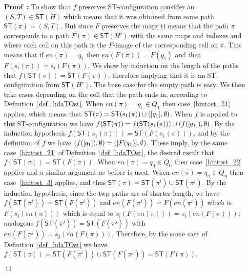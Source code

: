 \documentclass[submission,copyright,creativecommons]{eptcs}
\newenvironment{proof}[1][\!\!\,]{\vspace{1ex}\noindent\textbf{Proof #1: }}{\hfill$\Box$\vspace{2ex}}
\newcounter{case}
\newcommand\hintost{\ensuremath{\mathsf{ST}}}
\newcommand\finishPath[1]{\ensuremath{\mathit{en}(#1)}}
\newcommand{\equivClass}[2][]{\ensuremath{[#2]\ifthenelse{\equal{#1}{}}{}{_{#1}}}}
\begin{document}
\begin{proof}
To show that $f$ preserves ST-configuration consider an $(S,T)\in\hintost(H)$ which means that it was obtained from some path $\hintost(\pi)=(S,T)$. But since $F$ preserves the maps ti means that the path $\pi$ corresponds to a path $F(\pi)\in\hintost(H')$ with the same maps and indexes and where each cell on this path is the $F$-image of the corresponding cell on $\pi$. This means that if $\finishPath{\pi}=q_{1}$ then $\finishPath{F(\pi)}=F(q_{1})$ and that $F(s_{i}(\pi))=s_{i}(F(\pi))$. We show by induction on the length of the paths that $f(\hintost(\pi))=\hintost(F(\pi))$, therefore implying that it is an ST-configuration from $\hintost(H')$. The base case for the empty path is easy. We then take cases depending on the cell that the path ends in, according to Definition~\ref{def_hdaTOst}.
When $\finishPath{\pi}=q_{1}\in Q_{1}$ then case~\ref{hintost_21} applies, which means that $\hintost(\pi)=\hintost(s_{1}(\pi))\cup(\equivClass{q_{1}},\emptyset)$. When $f$ is applied to this ST-configuration we have $f(\hintost(\pi))=f(\hintost(s_{1}(\pi)))\cup(f(\equivClass{q_{1}}),\emptyset)$. By the induction hypothesis $f(\hintost(s_{1}(\pi)))=\hintost(F(s_{1}(\pi)))$, and by the definition of $f$ we have $(f(\equivClass{q_{1}}),\emptyset)=(\equivClass{F(q_{1})},\emptyset)$. These imply, by the same case~\ref{hintost_21} of Definition~\ref{def_hdaTOst}, the desired result that $f(\hintost(\pi))=\hintost(F(\pi))$.
When $\finishPath{\pi}=q_{0}\in Q_{0}$ then case~\ref{hintost_22} applies and a similar argument as before is used.
When $\finishPath{\pi}=q_{n}\in Q_{n}$ then case~\ref{hintost_3} applies, and thus $\hintost(\pi)=\hintost(\pi^{i})\cup\hintost(\pi^{j})$. By the induction hypothesis, since the twp paths are of shorter length, we have $f(\hintost(\pi^{i}))=\hintost(F(\pi^{i}))$ and $\finishPath{F(\pi^{i})}=F(\finishPath{\pi^{i}})$ which is $F(s_{i}(\finishPath{\pi}))$ which is equal to $s_{i}(F(\finishPath{\pi}))=s_{i}(\finishPath{F(\pi)})$; analogous $f(\hintost(\pi^{j}))=\hintost(F(\pi^{j}))$ with $\finishPath{F(\pi^{j})}=s_{j}(\finishPath{F(\pi)})$. Therefore, by the same case of Definition~\ref{def_hdaTOst} we have $f(\hintost(\pi))=\hintost(F(\pi^{i}))\cup\hintost(F(\pi^{j}))=\hintost(F(\pi))$.


\end{proof}
\end{document}
